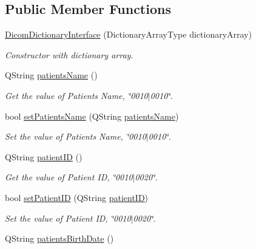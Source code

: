 \subsection*{Public Member Functions}
\begin{DoxyCompactItemize}
\item 
\hyperlink{class_dicom_dictionary_interface_a8c97276448308399415acccb9608af44}{Dicom\+Dictionary\+Interface} (Dictionary\+Array\+Type dictionary\+Array)
\begin{DoxyCompactList}\small\item\em Constructor with dictionary array. \end{DoxyCompactList}\item 
Q\+String \hyperlink{class_dicom_dictionary_interface_a1e774258d452b2054b90db885eb7915e}{patients\+Name} ()
\begin{DoxyCompactList}\small\item\em Get the value of Patient\textquotesingle{}s Name, \char`\"{}0010$\vert$0010\char`\"{}. \end{DoxyCompactList}\item 
bool \hyperlink{class_dicom_dictionary_interface_a7f951011d920b735e5945b4641790379}{set\+Patients\+Name} (Q\+String \hyperlink{class_dicom_dictionary_interface_a1e774258d452b2054b90db885eb7915e}{patients\+Name})
\begin{DoxyCompactList}\small\item\em Set the value of Patient\textquotesingle{}s Name, \char`\"{}0010$\vert$0010\char`\"{}. \end{DoxyCompactList}\item 
Q\+String \hyperlink{class_dicom_dictionary_interface_a48dbeb476ece87a7d039bb593f907cd6}{patient\+ID} ()
\begin{DoxyCompactList}\small\item\em Get the value of Patient ID, \char`\"{}0010$\vert$0020\char`\"{}. \end{DoxyCompactList}\item 
bool \hyperlink{class_dicom_dictionary_interface_aaaf4f3a64da678b7121cea7e1a061eea}{set\+Patient\+ID} (Q\+String \hyperlink{class_dicom_dictionary_interface_a48dbeb476ece87a7d039bb593f907cd6}{patient\+ID})
\begin{DoxyCompactList}\small\item\em Set the value of Patient ID, \char`\"{}0010$\vert$0020\char`\"{}. \end{DoxyCompactList}\item 
Q\+String \hyperlink{class_dicom_dictionary_interface_aad0d067a3af09163b58aadde3feb792f}{patients\+Birth\+Date} ()

\end{DoxyCompactItemize}
